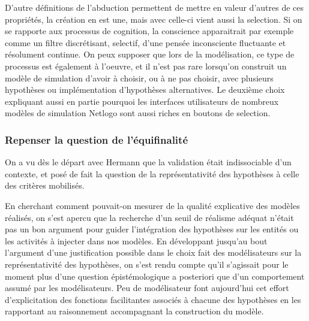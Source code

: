 D'autre définitions de l'abduction  permettent de mettre en valeur d'autres de ces propriétés, la création en est une, mais avec celle-ci vient aussi la selection. Si on se rapporte aux processus de cognition, la conscience apparaitrait par exemple comme un filtre discrétisant, selectif, d'une pensée inconsciente fluctuante et résolument continue. On peux supposer que lors de la modélisation, ce type de processus est également à l'oeuvre, et il n'est pas rare lorsqu'on construit un modèle de simulation d'avoir à choisir, ou à ne pas choisir, avec plusieurs hypothèses ou implémentation d'hypothèses alternatives. Le deuxième choix expliquant aussi en partie pourquoi les interfaces utilisateurs de nombreux modèles de simulation Netlogo sont aussi riches en boutons de selection.







\subsubsection{Repenser la question de l'équifinalité}

On a vu dès le départ avec Hermann que la validation était indissociable d'un contexte, et posé de fait la question de la représentativité des hypothèses à celle des critères mobilisés. 

En cherchant comment pouvait-on mesurer de la qualité explicative des modèles réalisés, on s'est apercu que la recherche d'un seuil de réalisme adéquat n'était pas un bon argument pour guider l'intégration des hypothèses sur les entités ou les activités à injecter dans nos modèles. En développant jusqu'au bout l'argument d'une justification possible dans le choix fait des modélisateurs sur la représentativité des hypothèses, on s'est rendu compte qu'il s'agissait pour le moment plus d'une question épistémologique a posteriori que d'un comportement assumé par les modélisateurs. Peu de modélisateur font aujourd'hui cet effort d'explicitation des fonctions facilitantes associés à chacune des hypothèses en les rapportant au raisonnement accompagnant la construction du modèle.

